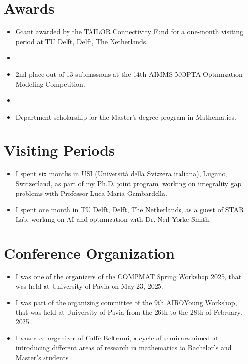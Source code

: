\documentclass[11pt,a4paper]{article}
\begin{document}
\section*{Awards}
\begin{itemize}[noitemsep, labelwidth=*,align=left, labelwidth=!]
    \item[\texttt{04/2023}] Grant awarded by the TAILOR Connectivity Fund for a one-month visiting period at TU Delft, Delft, The Netherlands.
    \item[] 
    \item[\texttt{07/2022}] 2nd place out of 13 submissions at the 14th AIMMS-MOPTA Optimization Modeling Competition.
    \item[]
    \item[\texttt{09/2019}] Department scholarship for the Master’s degree program in Mathematics. 
\end{itemize}
\section*{Visiting Periods}
\begin{itemize}[labelwidth=*,align=left, labelwidth=!]
    \item[\texttt{09/2023-02/2024}] I spent six months in USI (Università della Svizzera italiana), Lugano, Switzerland, as part of my Ph.D. joint program, working on integrality gap problems with Professor Luca Maria Gambardella.
    \item[\texttt{04/2023}] I spent one month in TU Delft, Delft, The Netherlands, as a guest of STAR Lab, working on AI and optimization with Dr. Neil Yorke-Smith.
\end{itemize}
\section*{Conference Organization}
\begin{itemize}[labelwidth=*,align=left, labelwidth=!]
    \item[\texttt{05/2025}] I was one of the organizers of the COMPMAT Spring Workshop 2025, that was held at University of Pavia on May 23, 2025.
    \item[\texttt{02/2025}] I was part of the organizing committee of the 9th AIROYoung Workshop, that was held at University of Pavia from the 26th to the 28th of February, 2025.
    \item[\texttt{2022-2024}] I was a co-organizer of Caffè Beltrami, a cycle of seminars aimed at introducing different areas of research in mathematics to Bachelor’s and Master’s students.
\end{itemize}
\end{document}
